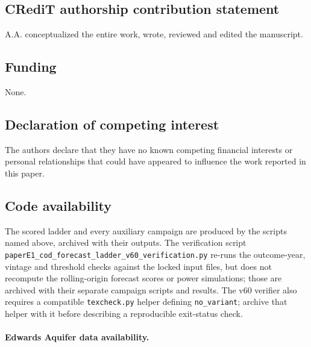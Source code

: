 \documentclass[11pt]{article}
\begin{document}
\subsection*{CRediT authorship contribution statement}

A.A. conceptualized the entire work, wrote, reviewed and edited the manuscript.

\subsection*{Funding}

None.

\subsection*{Declaration of competing interest}

The authors declare that they have no known competing financial
interests or personal relationships that could have appeared to
influence the work reported in this paper.

\subsection*{Code availability}

The scored ladder and every auxiliary campaign are produced by the scripts
named above, archived with their outputs. The verification script
\texttt{paperE1\_cod\_forecast\_ladder\_v60\_verification.py} re-runs
the outcome-year, vintage and threshold checks against the locked
input files, but does not recompute the rolling-origin forecast scores
or power simulations; those are archived with their separate campaign
scripts and results. The v60 verifier also requires a compatible
\texttt{texcheck.py} helper defining \texttt{no\_variant}; archive that helper
with it before describing a reproducible exit-status check.

\paragraph{Edwards Aquifer data availability.}
\end{document}
